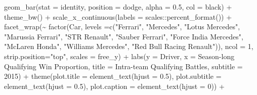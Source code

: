 \documentclass[
]{book}
\newenvironment{Shaded}{\begin{snugshade}}{\end{snugshade}}
\newcommand{\AttributeTok}[1]{\textcolor[rgb]{0.77,0.63,0.00}{#1}}
\newcommand{\DecValTok}[1]{\textcolor[rgb]{0.00,0.00,0.81}{#1}}
\newcommand{\FloatTok}[1]{\textcolor[rgb]{0.00,0.00,0.81}{#1}}
\newcommand{\FunctionTok}[1]{\textcolor[rgb]{0.00,0.00,0.00}{#1}}
\newcommand{\NormalTok}[1]{#1}
\newcommand{\SpecialCharTok}[1]{\textcolor[rgb]{0.00,0.00,0.00}{#1}}
\newcommand{\StringTok}[1]{\textcolor[rgb]{0.31,0.60,0.02}{#1}}
\begin{document}
\begin{Shaded}
\begin{Highlighting}[]
  \FunctionTok{geom\_bar}\NormalTok{(}\AttributeTok{stat =} \StringTok{\textquotesingle{}identity\textquotesingle{}}\NormalTok{, }\AttributeTok{position =} \StringTok{\textquotesingle{}dodge\textquotesingle{}}\NormalTok{, }\AttributeTok{alpha =} \FloatTok{0.5}\NormalTok{, }\AttributeTok{col =} \StringTok{\textquotesingle{}black\textquotesingle{}}\NormalTok{) }\SpecialCharTok{+}
  \FunctionTok{theme\_bw}\NormalTok{() }\SpecialCharTok{+}
  \FunctionTok{scale\_x\_continuous}\NormalTok{(}\AttributeTok{labels =}\NormalTok{ scales}\SpecialCharTok{::}\FunctionTok{percent\_format}\NormalTok{()) }\SpecialCharTok{+}
  \FunctionTok{facet\_wrap}\NormalTok{(}\SpecialCharTok{\textasciitilde{}} \FunctionTok{factor}\NormalTok{(Car, }
                      \AttributeTok{levels =}\FunctionTok{c}\NormalTok{(}\StringTok{"Ferrari"}\NormalTok{,}
                                 \StringTok{"Mercedes"}\NormalTok{,}
                                 \StringTok{"Lotus Mercedes"}\NormalTok{,}
                                 \StringTok{"Marussia Ferrari"}\NormalTok{,}
                                \StringTok{"STR Renault"}\NormalTok{,}
                                 \StringTok{"Sauber Ferrari"}\NormalTok{, }
                                 \StringTok{"Force India Mercedes"}\NormalTok{,}
                                 \StringTok{"McLaren Honda"}\NormalTok{,}
                                 \StringTok{"Williams Mercedes"}\NormalTok{,}
                                 \StringTok{"Red Bull Racing Renault"}\NormalTok{)),}
             \AttributeTok{ncol =} \DecValTok{1}\NormalTok{, }\AttributeTok{strip.position=}\StringTok{"top"}\NormalTok{, }\AttributeTok{scales =} \StringTok{\textquotesingle{}free\_y\textquotesingle{}}\NormalTok{) }\SpecialCharTok{+}
  \FunctionTok{labs}\NormalTok{(}\AttributeTok{y =} \StringTok{\textquotesingle{}Driver\textquotesingle{}}\NormalTok{,}
       \AttributeTok{x =} \StringTok{\textquotesingle{}Season{-}long Qualifying Win Proportion\textquotesingle{}}\NormalTok{,}
       \AttributeTok{title =} \StringTok{\textquotesingle{}Intra{-}team Qualifying Battles\textquotesingle{}}\NormalTok{,}
       \AttributeTok{subtitle =} \StringTok{\textquotesingle{}2015\textquotesingle{}}\NormalTok{) }\SpecialCharTok{+}
  \FunctionTok{theme}\NormalTok{(}\AttributeTok{plot.title =} \FunctionTok{element\_text}\NormalTok{(}\AttributeTok{hjust =} \FloatTok{0.5}\NormalTok{),}
        \AttributeTok{plot.subtitle =} \FunctionTok{element\_text}\NormalTok{(}\AttributeTok{hjust =} \FloatTok{0.5}\NormalTok{),}
        \AttributeTok{plot.caption =} \FunctionTok{element\_text}\NormalTok{(}\AttributeTok{hjust =} \DecValTok{0}\NormalTok{)) }\SpecialCharTok{+}

\end{Highlighting}
\end{Shaded}
\end{document}
